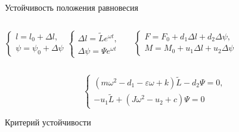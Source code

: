 \documentclass[ignoreonframetext,unicode]{beamer}
\begin{document}
\begin{frame}{Устойчивость положения равновесия}
	\vspace*{-2mm}
	\begin{columns}
		
	\begin{block}{}
		\vspace*{0mm}
		\begin{equation*}
			\begin{cases}
				l = l_0 + \Delta{l}, \\
				\psi = \psi_0 + \Delta{\psi}
			\end{cases}
			\begin{cases}
			\Delta{l} = \tilde{L} e^{\omega t}, \\
			\Delta{\psi} = \Psi e^{\omega t}
			\end{cases}
			\label{kjdkjsnadkjadsbafabjb}
		\end{equation*}
	\end{block}

	\begin{block}{}
		\vspace*{0mm}
		\begin{equation*}
			\begin{cases}
			F = F_0 + d_1 \Delta{l} + d_2 \Delta{\psi}, \\
			M = M_0 + u_1 \Delta{l} + u_2 \Delta{\psi}
			\end{cases}
			\label{kjdkjsasdsanadkjadsbafabjb}
		\end{equation*}
	\end{block}
	
	\end{columns}

\begin{block}{}
	\vspace*{-2mm}
	\begin{equation*}
		\begin{cases}
			\left( m \omega^2 - d_1 - \varepsilon \omega + k \right) \tilde{L} - d_2 \Psi = 0, \\
			- u_1 \tilde{L} + \left(J \omega^2 - u_2 + c \right) \Psi 	 = 0
		\end{cases}
		\label{kjdkjsnadkjddadsbafabjb}
	\end{equation*}
\end{block}

\vspace*{-2mm}
\begin{block}{Критерий устойчивости}
	\vspace*{-2mm}
	\begin{columns}
		

\end{columns}
\end{block}
\end{frame}
\end{document}
